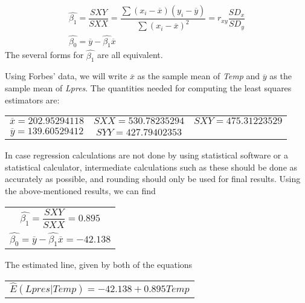 \documentclass{article}
\begin{document}
    \begin{align}
        \hat{\beta_{1}} = \dfrac{SXY}{SXX} = \dfrac
        {\displaystyle\sum(x_{i}-\overline{x})(y_{i}-\overline{y})}
        {\displaystyle \sum {\left(x_{i} - \overline{x}\right)}^2} 
        = r_{xy} \dfrac{SD_{x}}{SD_{y}}
        \\
        \hat{\beta_{0}} = \overline{y} - \hat{\beta_{1}} \overline{x}
    \end{align}
    The several forms for $\hat{\beta_{1}}$ are all equivalent.
    
    
    Using Forbes’ data, we will write $\overline{x}$ as the sample mean of \textit{Temp} and $\overline{y}$ as the sample mean of \textit{Lpres}. The quantities needed for computing the least squares estimators are: 
    
    \begin{center}
        \begin{tabular}{c c c}
            $\overline{x} = 202.95294118 $ & $SXX = 530.78235294 $ & $SXY = 475.31223529 $ \\
            $\overline{y} = 139.60529412 $ & $SYY = 427.79402353 $
        \end{tabular}
    \end{center}
    
    In case regression calculations are not done by using statistical software or a statistical calculator, intermediate calculations such as these should be done as accurately as possible, and rounding should only be used for final results. Using the above-mentioned results, we can find
    
    \begin{center}
        \begin{tabular}{c}
        ${\hat{\beta_{1}} = \dfrac{SXY}{SXX} = 0.895}$ \\
        ${\hat{\beta_{0}} = \overline{y} - \hat{\beta_{1}} \overline{x} = -42.138}$
        \end{tabular} 
    \end{center}
    
    The estimated line, given by both of the equations

    \begin{center}
        \begin{tabular}{c}
            ${\hat{E} (Lpres|Temp) = -42.138 + 0.895Temp}$ \\
        \end{tabular} 
    \end{center}
\end{document}
